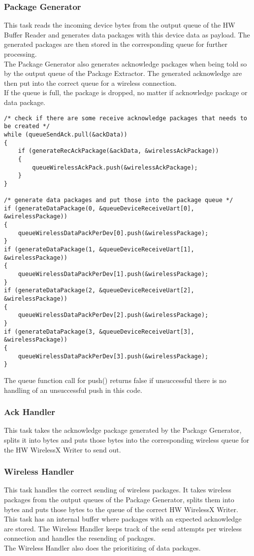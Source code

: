 \subsubsection{Package Generator}
This task reads the incoming device bytes from the output queue of the HW Buffer Reader and generates data packages with this device data as payload. The generated packages are then stored in the corresponding queue for further processing.\\
The Package Generator also generates acknowledge packages when being told so by the output queue of the Package Extractor. The generated acknowledge are then put into the correct queue for a wireless connection.\\
If the queue is full, the package is dropped, no matter if acknowledge package or data package.\\
%
\begin{lstlisting}
/* check if there are some receive acknowledge packages that needs to be created */
while (queueSendAck.pull(&ackData))
{
    if (generateRecAckPackage(&ackData, &wirelessAckPackage))
    {
        queueWirelessAckPack.push(&wirelessAckPackage);
    }
}

/* generate data packages and put those into the package queue */
if (generateDataPackage(0, &queueDeviceReceiveUart[0], &wirelessPackage))
{
    queueWirelessDataPackPerDev[0].push(&wirelessPackage);
}
if (generateDataPackage(1, &queueDeviceReceiveUart[1], &wirelessPackage))
{
    queueWirelessDataPackPerDev[1].push(&wirelessPackage);
}
if (generateDataPackage(2, &queueDeviceReceiveUart[2], &wirelessPackage))
{
    queueWirelessDataPackPerDev[2].push(&wirelessPackage);
}
if (generateDataPackage(3, &queueDeviceReceiveUart[3], &wirelessPackage))
{
    queueWirelessDataPackPerDev[3].push(&wirelessPackage);
}
\end{lstlisting}
%
The queue function call for push() returns false if unsuccessful there is no handling of an unsuccessful push in this code.\\
%
\subsubsection{Ack Handler}
This task takes the acknowledge package generated by the Package Generator, splits it into bytes and puts those bytes into the corresponding wireless queue for the HW WirelessX Writer to send out.
\subsubsection{Wireless Handler}
This task handles the correct sending of wireless packages. It takes wireless packages from the output queues of the Package Generator, splits them into bytes and puts those bytes to the queue of the correct HW WirelessX Writer.\\
This task has an internal buffer where packages with an expected acknowledge are stored. The Wireless Handler keeps track of the send attempts per wireless connection and handles the resending of packages.\\
The Wireless Handler also does the prioritizing of data packages.
%
%
